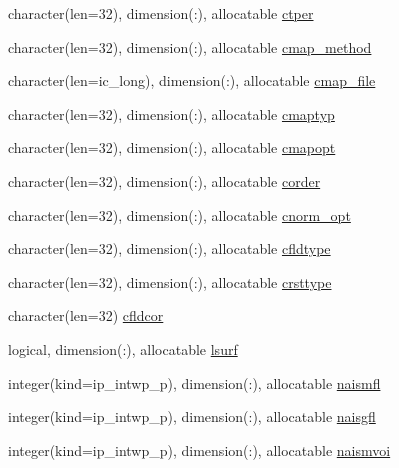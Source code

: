 \begin{DoxyCompactItemize}
\item 
character(len=32), dimension(\+:), allocatable \hyperlink{namespacemod__oasis__namcouple_a48b8ec939d711809229e738e68efe6b4}{ctper}
\item 
character(len=32), dimension(\+:), allocatable \hyperlink{namespacemod__oasis__namcouple_aa5f62496787c727e9704d243a700e19d}{cmap\+\_\+method}
\item 
character(len=ic\+\_\+long), dimension(\+:), allocatable \hyperlink{namespacemod__oasis__namcouple_a6dbd7bccbfa28b209a4bc58131f8cf11}{cmap\+\_\+file}
\item 
character(len=32), dimension(\+:), allocatable \hyperlink{namespacemod__oasis__namcouple_a3aaa6f326df10eb6e4417ad72e436b41}{cmaptyp}
\item 
character(len=32), dimension(\+:), allocatable \hyperlink{namespacemod__oasis__namcouple_a15cc0b3e86b5e594e1440154d1860f0c}{cmapopt}
\item 
character(len=32), dimension(\+:), allocatable \hyperlink{namespacemod__oasis__namcouple_a7c8548e08b7939c8c13977aba65e8ac9}{corder}
\item 
character(len=32), dimension(\+:), allocatable \hyperlink{namespacemod__oasis__namcouple_a5fdd72f253cfedfec2f198776442d132}{cnorm\+\_\+opt}
\item 
character(len=32), dimension(\+:), allocatable \hyperlink{namespacemod__oasis__namcouple_a069dc714cb69e8ddb649f1d9eb8c7454}{cfldtype}
\item 
character(len=32), dimension(\+:), allocatable \hyperlink{namespacemod__oasis__namcouple_a26bf14d9f10eaecc716179874bef22e3}{crsttype}
\item 
character(len=32) \hyperlink{namespacemod__oasis__namcouple_a7322d891595fce1f3fb249aa936ccb33}{cfldcor}
\item 
logical, dimension(\+:), allocatable \hyperlink{namespacemod__oasis__namcouple_a902fe007f6c2505858bf72dbc64e43a2}{lsurf}
\item 
integer(kind=ip\+\_\+intwp\+\_\+p), dimension(\+:), allocatable \hyperlink{namespacemod__oasis__namcouple_a4a7cad8814c7811b364fd7d70b60b576}{naismfl}
\item 
integer(kind=ip\+\_\+intwp\+\_\+p), dimension(\+:), allocatable \hyperlink{namespacemod__oasis__namcouple_ada0ad7614eba9cc3a1e168484a520c33}{naisgfl}
\item 
integer(kind=ip\+\_\+intwp\+\_\+p), dimension(\+:), allocatable \hyperlink{namespacemod__oasis__namcouple_ae3d7c72b2f2f3ece9583cc0b25edbaba}{naismvoi}
\item 

\end{DoxyCompactItemize}

